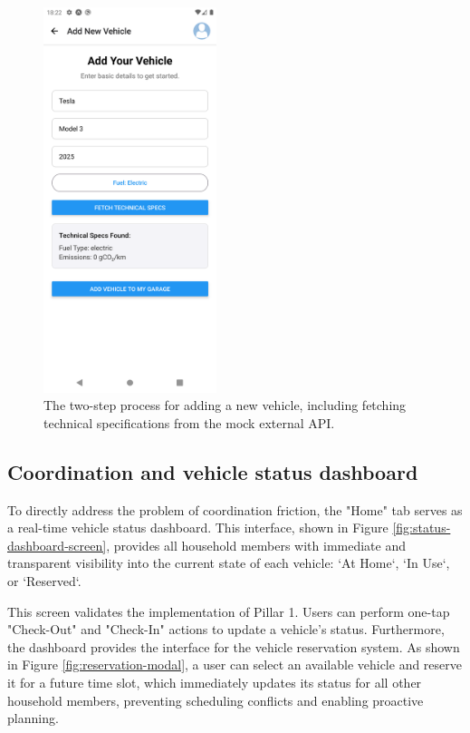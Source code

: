 \begin{figure}[H]
    \centering
    \includegraphics[width=0.45\textwidth]{images/results/add_vehicle_screen.png}
    \caption{The two-step process for adding a new vehicle, including fetching technical specifications from the mock external API.}
    \label{fig:add-vehicle-screen}
\end{figure}

\subsection{Coordination and vehicle status dashboard}
To directly address the problem of coordination friction, the "Home" tab serves as a real-time vehicle status dashboard. This interface, shown in Figure \ref{fig:status-dashboard-screen}, provides all household members with immediate and transparent visibility into the current state of each vehicle: `At Home`, `In Use`, or `Reserved`.

\textgap

This screen validates the implementation of Pillar 1. Users can perform one-tap "Check-Out" and "Check-In" actions to update a vehicle's status. Furthermore, the dashboard provides the interface for the vehicle reservation system. As shown in Figure \ref{fig:reservation-modal}, a user can select an available vehicle and reserve it for a future time slot, which immediately updates its status for all other household members, preventing scheduling conflicts and enabling proactive planning.

